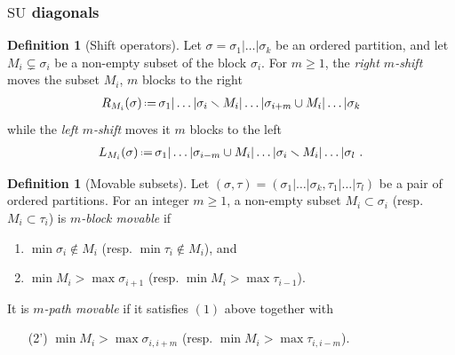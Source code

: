 \documentclass{amsart}
\theoremstyle{definition}
\newtheorem{definition}[theorem]{Definition}
\newcommand{\ssm}{\smallsetminus} %
\newcommand{\eqdef}{\mbox{\,\raisebox{0.2ex}{\scriptsize\ensuremath{\mathrm:}}\ensuremath{=}\,}} %
\newcommand{\SU}{\mathrm{SU}}
\begin{document}

\subsubsection{$\SU$ diagonals}

\begin{definition}[Shift operators]
\label{def:subset shifts}
Let $\sigma=\sigma_1|\dots|\sigma_k$ be an ordered partition, and let 
$M_i\subsetneq \sigma_{i}$ be a non-empty subset of the block $\sigma_i$.
For $m\geq 1$, the \emph{right $m$-shift} moves the subset $M_i$, $m$ blocks to the right  
\begin{align*}
    R_{M_i}(\sigma) \eqdef \sigma_1|\dots|\sigma_i \ssm M_i|\dots | \sigma_{i+m} \cup M_i|\dots|\sigma_k
\end{align*}
while the \emph{left $m$-shift} moves it $m$ blocks to the left 
\begin{align*}
    L_{M_{i}}(\sigma) \eqdef \sigma_1|\dots|\sigma_{i-m} \cup M_{i}| \dots |\sigma_{i} \ssm M_{i}|\dots|\sigma_l \ .
\end{align*}
\end{definition}

\begin{definition}[Movable subsets]
    \label{def:movable-subsets}
    Let $(\sigma,\tau) = (\sigma_1|\dots|\sigma_k,\tau_1|\dots|\tau_l)$ be a pair of ordered partitions.
    For an integer $m\geq 1$, a non-empty subset $M_i \subset \sigma_i$ (resp. $M_{i}\subset \tau_{i}$) is \emph{$m$-block movable} if 
    \begin{enumerate}
        \item $\min \sigma_i \notin M_i$ (resp. $\min \tau_{i} \notin M_i$), and
        \item $\min M_i> \max \sigma_{i+1}$ (resp. $\min M_{i}> \max \tau_{i-1}$).
    \end{enumerate}
    It is \emph{$m$-path movable} if it satisfies $(1)$ above together with
    \begin{enumerate}
        \item[(2')] $\min M_i> \max \sigma_{i,i+m}$ (resp. $\min M_{i}> \max \tau_{i,i-m}$).
    \end{enumerate}
\end{definition}
\end{document}
